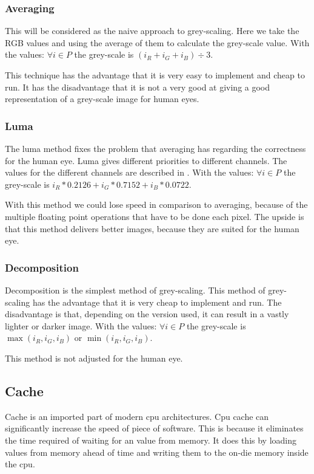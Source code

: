 \documentclass[a4paper]{article}
\begin{document}
\subsubsection{Averaging}
This will be considered as the naive approach to grey-scaling. Here we take the RGB values and using the average of them to calculate the grey-scale value. 
With the values: \( \forall i \in P \) the grey-scale is \( \left( i_{R} + i_{G} + i_{B} \right) \div 3 \).

This technique has the advantage that it is very easy to implement and cheap to run. It has the disadvantage that it is not a very good at giving a good representation of a grey-scale image for human eyes.

\subsubsection{Luma}
The luma method fixes the problem that averaging has regarding the correctness for the human eye. Luma gives different priorities to different channels. The values for the different channels are described in \cite{HDTV-REC}.
With the values: \( \forall i \in P \) the grey-scale is \(  i_{R}*0.2126 + i_{G}*0.7152 + i_{B}*0.0722  \).

With this method we could lose speed in comparison to averaging, because of the multiple floating point operations that have to be done each pixel. The upside is that this method delivers better images, because they are suited for the human eye.

\subsubsection{Decomposition}
Decomposition is the simplest method of grey-scaling. This method of grey-scaling has the advantage that it is very cheap to implement and run. The disadvantage is that, depending on the version used, it can result in a vastly lighter or darker image. 
With the values: \( \forall i \in P \) the grey-scale is \(  \max(i_{R}, i_{G}, i_{B}) \) or \(  \min(i_{R}, i_{G}, i_{B}) \).

This method is not adjusted for the human eye. 

\subsection{Cache}
Cache is an imported part of modern cpu architectures. Cpu cache can significantly increase the speed of piece of software. This is because it eliminates the time required of waiting for an value from memory. It does this by loading values from memory ahead of time and writing them to the on-die memory inside the cpu. 
\end{document}
